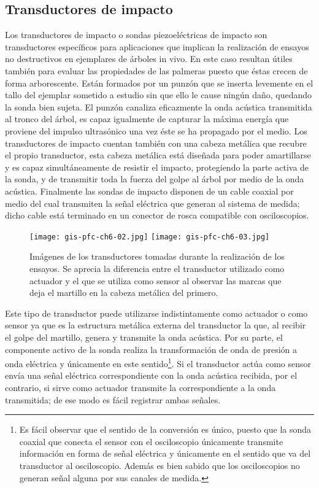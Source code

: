 \subsection{Transductores de impacto}

Los transductores de impacto o sondas piezoeléctricas de impacto son
transductores específicos para aplicaciones que implican la realización de
ensayos no destructivos en ejemplares de árboles in vivo. En este caso
resultan útiles también para evaluar las propiedades de las palmeras puesto
que éstas crecen de forma arborescente. Están formados por un punzón que se
inserta levemente en el tallo del ejemplar sometido a estudio sin que ello
le cause ningún daño, quedando la sonda bien sujeta. El punzón canaliza
eficazmente la onda acústica transmitida al tronco del árbol, es capaz
igualmente de capturar la máxima energía que proviene del impulso
ultrasónico una vez éste se ha propagado por el medio. Los transductores de
impacto cuentan también con una cabeza metálica que recubre el propio
transductor, esta cabeza metálica está diseñada para poder amartillarse y
es capaz simultáneamente de resistir el impacto, protegiendo la parte
activa de la sonda, y de transmitir toda la fuerza del golpe al árbol por
medio de la onda acústica. Finalmente las sondas de impacto disponen de un
cable coaxial por medio del cual transmiten la señal eléctrica que generan
al sistema de medida; dicho cable está terminado en un conector de rosca
compatible con osciloscopios.

\begin{figure}
    \begin{center}
	    \texttt{[image: gis-pfc-ch6-02.jpg]}
	\qquad
	    \texttt{[image: gis-pfc-ch6-03.jpg]}
    \end{center}
    \caption[Transductores de impacto utilizados durante los
    ensayos]{Imágenes de los transductores tomadas durante la realización
    de los ensayos. Se aprecia la diferencia entre el transductor utilizado
    como actuador y el que se utiliza como sensor al observar las marcas
    que deja el martillo en la cabeza metálica del primero.}
    \label{fig:transducers}
\end{figure}

Este tipo de transductor puede utilizarse indistintamente como actuador o
como sensor ya que es la estructura metálica externa del transductor la
que, al recibir el golpe del martillo, genera y transmite la onda acústica.
Por su parte, el componente activo de la sonda realiza la transformación de
onda de presión a onda eléctrica y únicamente en este sentido\footnote{Es
fácil observar que el sentido de la conversión es único, puesto que la
sonda coaxial que conecta el sensor con el osciloscopio únicamente
transmite información en forma de señal eléctrica y únicamente en el
sentido que va del transductor al osciloscopio. Además es bien sabido que
los osciloscopios no generan señal alguna por sus canales de medida.}. Si
el transductor actúa como sensor envía una señal eléctrica correspondiente
con la onda acústica recibida, por el contrario, si sirve como actuador
transmite la correspondiente a la onda transmitida; de ese modo es fácil
registrar ambas señales.

